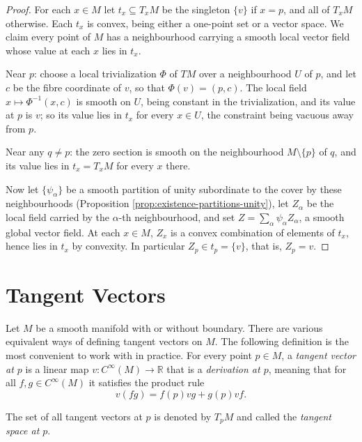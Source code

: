 \begin{proof}

For each $x \in M$ let $t_x \subseteq T_xM$ be the singleton $\{v\}$ if $x = p$, and all of $T_xM$ otherwise. Each $t_x$ is convex, being either a one-point set or a vector space. We claim every point of $M$ has a neighbourhood carrying a smooth local vector field whose value at each $x$ lies in $t_x$.

Near $p$: choose a local trivialization $\Phi$ of $TM$ over a neighbourhood $U$ of $p$, and let $c$ be the fibre coordinate of $v$, so that $\Phi(v) = (p, c)$. The local field $x \mapsto \Phi^{-1}(x, c)$ is smooth on $U$, being constant in the trivialization, and its value at $p$ is $v$; so its value lies in $t_x$ for every $x \in U$, the constraint being vacuous away from $p$.

Near any $q \neq p$: the zero section is smooth on the neighbourhood $M \setminus \{p\}$ of $q$, and its value lies in $t_x = T_xM$ for every $x$ there.

Now let $\{\psi_\alpha\}$ be a smooth partition of unity subordinate to the cover by these neighbourhoods (Proposition \ref{prop:existence-partitions-unity}), let $Z_\alpha$ be the local field carried by the $\alpha$-th neighbourhood, and set $Z = \sum_\alpha \psi_\alpha Z_\alpha$, a smooth global vector field. At each $x \in M$, $Z_x$ is a convex combination of elements of $t_x$, hence lies in $t_x$ by convexity. In particular $Z_p \in t_p = \{v\}$, that is, $Z_p = v$.
\end{proof}

\section{Tangent Vectors}

Let $M$ be a smooth manifold with or without boundary. There are various equivalent ways of defining tangent vectors on $M$. The following definition is the most
convenient to work with in practice. For every point $p \in M$, a \textit{tangent vector at $p$}
is a linear map $v : C^{\infty}(M) \to \mathbb{R}$ that is a \textit{derivation at $p$}, meaning that for all
$f, g \in C^{\infty}(M)$ it satisfies the product rule
\begin{equation}
v(fg) = f(p)vg + g(p)vf.
\tag{A.1}
\end{equation}

The set of all tangent vectors at $p$ is denoted by $T_p M$ and called the \textit{tangent space
at $p$}.

